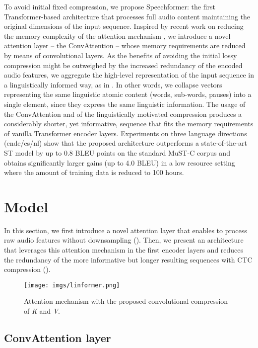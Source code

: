 \documentclass[11pt]{article}
\begin{document}
To avoid initial fixed compression, we propose Speechformer: the first Transformer-based architecture that processes full audio content maintaining the original dimensions
of the input sequence. Inspired by recent work on reducing the memory complexity of the attention mechanism \cite{wang2020linformer}, 
we introduce a novel attention layer -- the ConvAttention -- whose memory requirements are reduced by means of convolutional layers.
As the benefits of avoiding the initial lossy compression might be outweighed by the increased redundancy of the encoded audio features, we aggregate the high-level representation of the input sequence in a linguistically informed way,
as in \cite{liu2020bridging,gaido-etal-2021-ctc}. In other words, we collapse vectors representing the same linguistic atomic content (words, sub-words, pauses)
into a single element, since they express the same linguistic information.
The usage of the ConvAttention and of the linguistically motivated compression
produces a considerably shorter, yet informative, sequence that fits the memory requirements of vanilla Transformer encoder layers.
Experiments on three language directions (ende/es/nl)
show that the proposed architecture outperforms a state-of-the-art ST model by up to 0.8 BLEU points on the standard MuST-C corpus and obtains significantly larger gains (up to 4.0 BLEU) in a low resource setting where the amount of training data is reduced to 100 hours.



\section{Model}
\label{sec:model}

In this section, we first introduce a novel attention layer that enables to process raw audio features without downsampling ().
Then, we present an architecture that leverages this attention mechanism in the first encoder layers and reduces the redundancy of the more informative but longer resulting sequences with CTC compression ().

\begin{figure}[tbp]
\centering
\texttt{[image: imgs/linformer.png]}
\caption{Attention mechanism with the proposed convolutional compression of \textit{K} and \textit{V}.
}
\label{fig:attn}
\end{figure}

\subsection{ConvAttention layer}
\label{sec:convatt}
\end{document}
